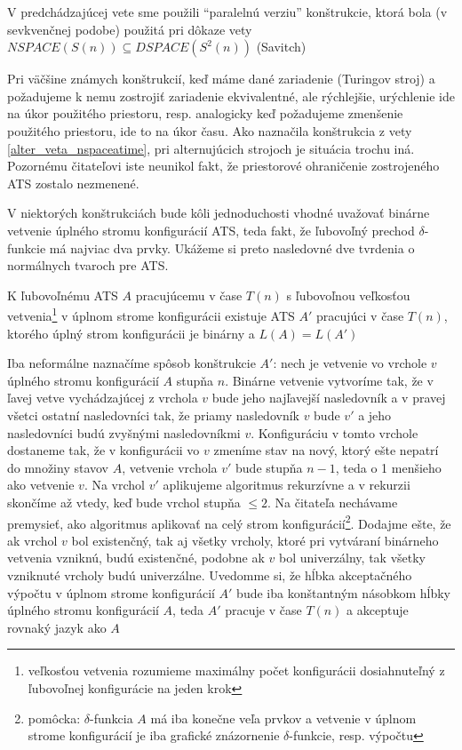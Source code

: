 \begin{poznamka}
V predchádzajúcej vete sme použili ``paralelnú verziu''
konštrukcie, ktorá bola (v sevkvenčnej podobe) použitá pri dôkaze
vety $NSPACE(S(n))\subseteq DSPACE(S^2(n))$ (Savitch)
\end{poznamka}

Pri väčšine známych konštrukcií, keď máme dané zariadenie
(Turingov stroj) a požadujeme k nemu zostrojiť zariadenie
ekvivalentné, ale rýchlejšie, urýchlenie ide na úkor použitého
priestoru, resp. analogicky keď požadujeme zmenšenie použitého
priestoru, ide to na úkor času. Ako naznačila konštrukcia z vety
\ref{alter_veta_nspaceatime}, pri alternujúcich strojoch je situácia trochu
iná. Pozornému čitateľovi iste neunikol fakt, že priestorové
ohraničenie zostrojeného ATS zostalo nezmenené.

\smallskip
V niektorých konštrukciách bude kôli jednoduchosti vhodné uvažovať
binárne vetvenie úplného stromu konfigurácií ATS, teda fakt, že
ľubovoľný prechod $\delta$-funkcie má najviac dva prvky. Ukážeme
si preto nasledovné dve tvrdenia o normálnych tvaroch pre ATS.

\begin{lema}\label{binarny_nt}
K ľubovoľnému ATS $A$ pracujúcemu v čase $T(n)$ s ľubovoľnou
veľkosťou vetvenia\footnote{veľkosťou vetvenia rozumieme maximálny
počet konfigurácii dosiahnuteľný z ľubovoľnej konfigurácie na
jeden krok} v úplnom strome konfigurácii existuje ATS $A'$
pracujúci v čase $T(n)$, ktorého úplný strom konfigurácii je
binárny a $L(A)=L(A')$
\end{lema}

\begin{dokaz}
Iba neformálne naznačíme spôsob konštrukcie $A'$: nech je vetvenie
vo vrchole $v$ úplného stromu konfigurácií $A$ stupňa $n$. Binárne
vetvenie vytvoríme tak, že v ľavej vetve vychádzajúcej z vrchola
$v$ bude jeho najľavejší nasledovník a v pravej všetci ostatní
nasledovníci tak, že priamy nasledovník $v$ bude $v'$ a jeho
nasledovníci budú zvyšnými nasledovníkmi $v$. Konfiguráciu v tomto
vrchole dostaneme tak, že v konfigurácii vo $v$ zmeníme stav na
nový, ktorý ešte nepatrí do množiny stavov $A$, vetvenie vrchola
$v'$ bude stupňa $n-1$, teda o 1 menšieho ako vetvenie $v$. Na
vrchol $v'$ aplikujeme algoritmus rekurzívne a v rekurzii skončíme
až vtedy, keď bude vrchol stupňa $\leq2$. Na čitateľa nechávame
premysieť, ako algoritmus aplikovať na celý strom
konfigurácií\footnote{pomôcka: $\delta$-funkcia $A$ má iba konečne
veľa prvkov a vetvenie v úplnom strome konfigurácií je iba
grafické znázornenie $\delta$-funkcie, resp. výpočtu}. Dodajme
ešte, že ak vrchol $v$ bol existenčný, tak aj všetky vrcholy,
ktoré pri vytváraní binárneho vetvenia vzniknú, budú existenčné,
podobne ak $v$ bol univerzálny, tak všetky vzniknuté vrcholy budú
univerzálne. Uvedomme si, že hĺbka akceptačného výpočtu v úplnom
strome konfigurácií $A'$ bude iba konštantným násobkom hĺbky
úplného stromu konfigurácií $A$, teda $A'$ pracuje v čase $T(n)$ a
akceptuje rovnaký jazyk ako $A$
\end{dokaz}

